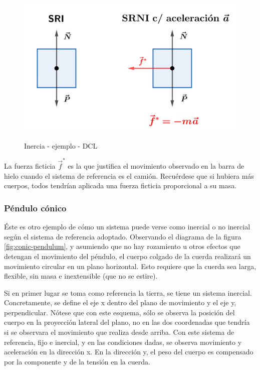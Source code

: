 \documentclass{article}
\begin{document}
\begin{figure}[ht]
\centering
\caption{Inercia - ejemplo - DCL}
\includegraphics[scale=0.8]{../../common/img/62.01/theory/10-dynamics-inertia-example.png}
\label{fig:inertia-example}
\end{figure}

La fuerza ficticia $\vec{f}^{*}$ es la que justifica el movimiento observado en la barra de hielo cuando el sistema de referencia es el camión. Recuérdese que si hubiera más cuerpos, todos tendrían aplicada una fuerza ficticia proporcional a su masa.

\subsubsection{Péndulo cónico}

Éste es otro ejemplo de cómo un sistema puede verse como inercial o no inercial según el sistema de referencia adoptado. Observando el diagrama de la figura \ref{fig:conic-pendulum}, y asumiendo que no hay rozamiento u otros efectos que detengan el movimiento del péndulo, el cuerpo colgado de la cuerda realizará un movimiento circular en un plano horizontal. Esto requiere que la cuerda sea larga, flexible, sin masa e inextensible (que no se estire).

Si en primer lugar se toma como referencia la tierra, se tiene un sistema inercial. Concretamente, se define el eje x dentro del plano de movimiento y el eje y, perpendicular. Nótese que con este esquema, sólo se observa la posición del cuerpo en la proyección lateral del plano, no en las dos coordenadas que tendría si se observara el movimiento que realiza desde arriba. Con este sistema de referencia, fijo e inercial, y en las condiciones dadas, se observa movimiento y aceleración en la dirección x. En la dirección y, el peso del cuerpo es compensado por la componente y de la tensión en la cuerda.
\end{document}
